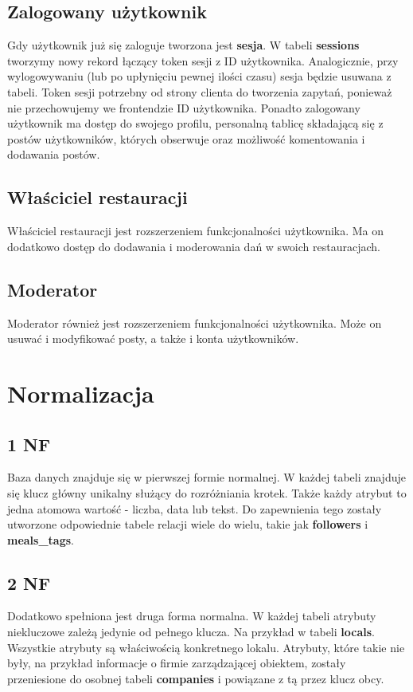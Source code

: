 \documentclass{report}
\begin{document}
\subsection*{Zalogowany użytkownik}
Gdy użytkownik już się zaloguje tworzona jest \textbf{sesja}. W tabeli
\textbf{sessions} tworzymy nowy rekord łączący token sesji z ID użytkownika.
Analogicznie, przy wylogowywaniu (lub po upłynięciu pewnej ilości czasu)
sesja będzie usuwana z tabeli. Token sesji potrzebny od strony clienta do
tworzenia zapytań, ponieważ nie przechowujemy we frontendzie ID użytkownika.
Ponadto zalogowany użytkownik ma dostęp do swojego profilu, personalną tablicę
składającą się z postów użytkowników, których obserwuje oraz możliwość komentowania
i dodawania postów.
\subsection*{Właściciel restauracji}
Właściciel restauracji jest rozszerzeniem funkcjonalności użytkownika. Ma on
dodatkowo dostęp do dodawania i moderowania dań w swoich restauracjach.
\subsection*{Moderator}
Moderator również jest rozszerzeniem funkcjonalności użytkownika. Może on
usuwać i modyfikować posty, a także i konta użytkowników.

\section*{Normalizacja}

\subsection*{1 NF}
Baza danych znajduje się w pierwszej formie normalnej. 
W każdej tabeli znajduje się klucz główny unikalny służący do rozróżniania krotek.
Także każdy atrybut to jedna atomowa wartość - liczba, data lub tekst.
Do zapewnienia tego zostały utworzone odpowiednie tabele relacji wiele do wielu, takie jak 
\textbf{followers} i \textbf{meals\_tags}.


\subsection*{2 NF}
Dodatkowo spełniona jest druga forma normalna. 
W każdej tabeli atrybuty niekluczowe zależą jedynie od pełnego klucza.
Na przykład w tabeli \textbf{locals}. Wszystkie atrybuty są właściwością 
konkretnego lokalu. Atrybuty, które takie nie były, na przykład informacje
o firmie zarządzającej obiektem, zostały przeniesione do osobnej tabeli \textbf{companies}
i powiązane z tą przez klucz obcy.
\end{document}
